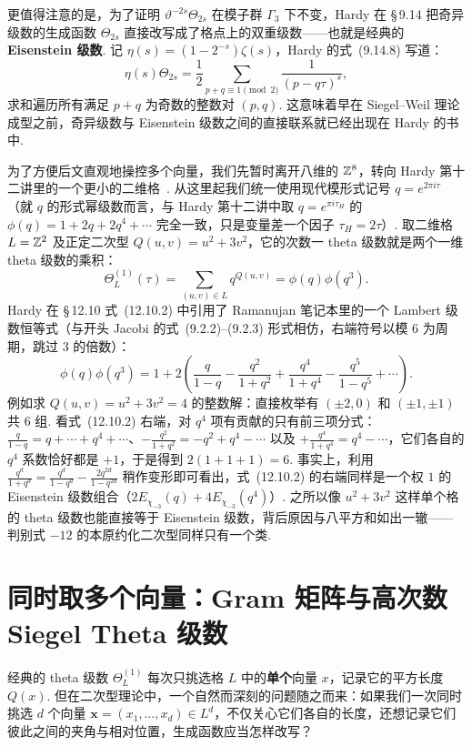 更值得注意的是，为了证明 $\vartheta^{-2s}\Theta_{2s}$ 在模子群 $\Gamma_3$ 下不变，Hardy 在 \S\,9.14 把奇异级数的生成函数 $\Theta_{2s}$ 直接改写成了格点上的双重级数——也就是经典的 \textbf{Eisenstein 级数}. 记 $\eta(s)=(1-2^{-s})\zeta(s)$，Hardy 的式~(9.14.8) 写道：
\begin{equation*}\tag{9.14.8}
\eta(s)\Theta_{2s}=\frac{1}{2}\sum_{p+q\equiv 1\pmod 2}\frac{1}{(p-q\tau)^s},
\end{equation*}
求和遍历所有满足 $p+q$ 为奇数的整数对 $(p,q)$. 这意味着早在 Siegel--Weil 理论成型之前，奇异级数与 Eisenstein 级数之间的直接联系就已经出现在 Hardy 的书中.

为了方便后文直观地操控多个向量，我们先暂时离开八维的 $\mathbb{Z}^8$，转向 Hardy 第十二讲里的一个更小的二维格~\cite[\S\,12.2 与 \S\,12.10，第~213、220~页]{Hardy1940}. 从这里起我们统一使用现代模形式记号 $q=e^{2\pi i\tau}$（就 $q$ 的形式幂级数而言，与 Hardy 第十二讲中取 $q=e^{\pi i\tau_H}$ 的 $\phi(q)=1+2q+2q^4+\cdots$ 完全一致，只是变量差一个因子 $\tau_H=2\tau$）. 取二维格 $L=\mathbb{Z}^2$ 及正定二次型 $Q(u,v)=u^2+3v^2$，它的次数一 theta 级数就是两个一维 theta 级数的乘积：
\[
\Theta_L^{(1)}(\tau)=\sum_{(u,v)\in L}q^{Q(u,v)}=\phi(q)\phi(q^3).
\]
Hardy 在 \S\,12.10 式~(12.10.2) 中引用了 Ramanujan 笔记本里的一个 Lambert 级数恒等式（与开头 Jacobi 的式~(9.2.2)--(9.2.3) 形式相仿，右端符号以模 $6$ 为周期，跳过 $3$ 的倍数）：
\begin{equation*}\tag{12.10.2}
\phi(q)\phi(q^3)=1+2\left(\frac{q}{1-q}-\frac{q^2}{1+q^2}+\frac{q^4}{1+q^4}-\frac{q^5}{1-q^5}+\cdots\right).
\end{equation*}
例如求 $Q(u,v)=u^2+3v^2=4$ 的整数解：直接枚举有 $(\pm 2,0)$ 和 $(\pm 1,\pm 1)$ 共 $6$ 组. 看式~(12.10.2) 右端，对 $q^4$ 项有贡献的只有前三项分式：$\frac{q}{1-q}=q+\cdots+q^4+\cdots$、$-\frac{q^2}{1+q^2}=-q^2+q^4-\cdots$ 以及 $+\frac{q^4}{1+q^4}=q^4-\cdots$，它们各自的 $q^4$ 系数恰好都是 $+1$，于是得到 $2(1+1+1)=6$. 事实上，利用 $\frac{q^d}{1+q^d}=\frac{q^d}{1-q^d}-\frac{2q^{2d}}{1-q^{2d}}$ 稍作变形即可看出，式~(12.10.2) 的右端同样是一个权 $1$ 的 Eisenstein 级数组合（$2E_{\chi_{-3}}(q)+4E_{\chi_{-3}}(q^4)$）. 之所以像 $u^2+3v^2$ 这样单个格的 theta 级数也能直接等于 Eisenstein 级数，背后原因与八平方和如出一辙——判别式 $-12$ 的本原约化二次型同样只有一个类.

\section{同时取多个向量：Gram 矩阵与高次数 Siegel Theta 级数}

经典的 theta 级数 $\Theta_L^{(1)}$ 每次只挑选格 $L$ 中的\textbf{单个}向量 $x$，记录它的平方长度 $Q(x)$. 但在二次型理论中，一个自然而深刻的问题随之而来：如果我们一次同时挑选 $d$ 个向量 $\mathbf x=(x_1,\ldots,x_d)\in L^d$，不仅关心它们各自的长度，还想记录它们彼此之间的夹角与相对位置，生成函数应当怎样改写？

